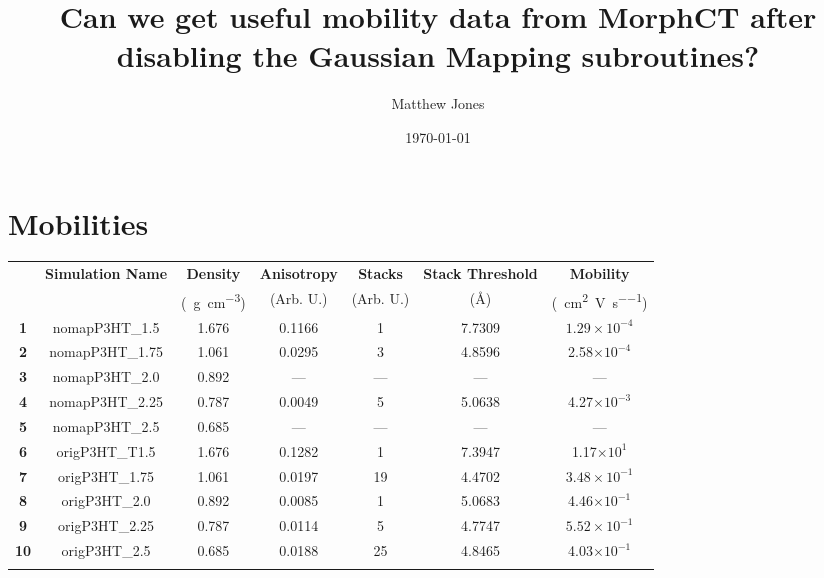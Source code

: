 \documentclass[12pt]{article}
\title{Can we get useful mobility data from MorphCT after disabling the Gaussian Mapping subroutines?}
\author{Matthew Jones}
\date{\today}
\def\mobunits{\square\centi\meter\per\volt\per\second}
\def\gcm{\gram\per\cubic\centi\meter}
\def\ccg{\cellcolor{gray}}
\begin{document}
\maketitle


\section{Mobilities}

\begin{center}
\begin{adjustbox}{max width = \textwidth}
\begin{tabular}{| c | c | c | c | c | c | c |}
\hline
\rule{0pt}{2.5ex} 
\multirow{2}{*}{\textbf{ID}}&\multirow{2}{*}{\textbf{Simulation Name}}&\textbf{Density}&\textbf{Anisotropy}&\textbf{Stacks}&\textbf{Stack Threshold}&\textbf{Mobility}\\
                            &&(\SI{}{\gcm})&(Arb. U.)&(Arb. U.)&(\AA)&(\SI{}{\mobunits})\\
\hhline{|=======|}
\textbf{1}&\rule{0pt}{2.5ex}nomapP3HT\_1.5&1.676&0.1166&1&7.7309&$1.29\times 10^{-4}$\\
\textbf{\ccg2}&\rule{0pt}{2.5ex}{\ccg}nomapP3HT\_1.75&\ccg1.061&\ccg0.0295&\ccg3&\ccg4.8596&\ccg2.58$\times 10^{-4}$\\
\textbf{3}&\rule{0pt}{2.5ex}nomapP3HT\_2.0&0.892&---&---&---&---\\
\textbf{\ccg4}&\rule{0pt}{2.5ex}{\ccg}nomapP3HT\_2.25&\ccg0.787&\ccg0.0049&\ccg5&\ccg5.0638&\ccg4.27$\times 10^{-3}$\\
\textbf{5}&\rule{0pt}{2.5ex}nomapP3HT\_2.5&0.685&---&---&---&---\\
\hhline{|=======|}
\textbf{\ccg6}&\rule{0pt}{2.5ex}{\ccg}origP3HT\_T1.5&\ccg1.676&\ccg0.1282&\ccg1&\ccg7.3947&\ccg1.17$\times 10^{1}$\\
\textbf{7}&\rule{0pt}{2.5ex}origP3HT\_1.75&1.061&0.0197&19&4.4702&$3.48\times 10^{-1}$\\
\textbf{\ccg8}&\rule{0pt}{2.5ex}{\ccg}origP3HT\_2.0&\ccg0.892&\ccg0.0085&\ccg1&\ccg5.0683&\ccg4.46$\times 10^{-1}$\\
\textbf{9}&\rule{0pt}{2.5ex}origP3HT\_2.25&0.787&0.0114&5&4.7747&$5.52\times 10^{-1}$\\
\textbf{\ccg10}&\rule{0pt}{2.5ex}{\ccg}origP3HT\_2.5&\ccg0.685&\ccg0.0188&\ccg25&\ccg4.8465&\ccg4.03$\times 10^{-1}$\\
\hhline{-------}
\end{tabular}\label{table:mob}
\end{adjustbox}
\end{center}
\end{document}
